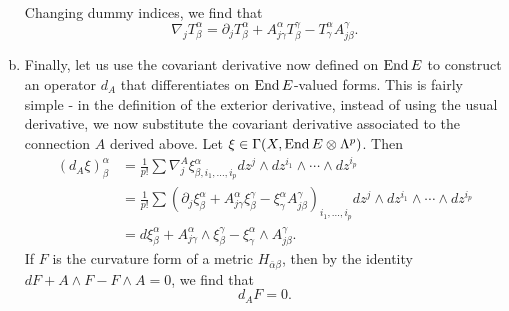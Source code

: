 \documentclass{../mathnotes}
\begin{document}
\begin{enumerate}[(a)]
\begin{align*}
        \end{align*}
        Changing dummy indices, we find that
        \[\nabla_jT^\alpha_\beta=\partial_jT^\alpha_\beta+A_{j\gamma}^\alpha T_\beta^\gamma -T^\alpha_\gamma A^\gamma_{j\beta}.\]
    \item Finally, let us use the covariant derivative now defined on $\operatorname{End} E$ to construct an operator $d_A$
        that differentiates on $\operatorname{End} E$-valued forms. This is fairly simple - in the definition of the exterior derivative, instead of using the usual
        derivative, we now substitute the covariant derivative associated to the connection $A$ derived above. Let $\xi\in\Gamma(X,\operatorname{End} E\otimes\Lambda^p)$. Then
        \begin{align*}
            (d_A\xi)^\alpha_\beta&=\frac{1}{p!}\sum\nabla_j^A\xi^\alpha_{\beta,i_1,\ldots,i_p}dz^j\wedge dz^{i_1}\wedge\cdots\wedge dz^{i_p}\\
            &=\frac{1}{p!}\sum\left(\partial_j\xi^\alpha_{\beta}+A_{j\gamma}^\alpha\xi^\gamma_\beta-\xi^\alpha_\gamma A_{j\beta}^\gamma \right)_{i_1,\ldots,i_p}dz^j\wedge dz^{i_1}\wedge\cdots\wedge dz^{i_p}\\
            &=d\xi^\alpha_\beta+A^\alpha_{j\gamma}\wedge\xi^\gamma_\beta-\xi^\alpha_\gamma\wedge A^\gamma_{j\beta}.
        \end{align*}
        If $F$ is the curvature form of a metric $H_{\bar\alpha\beta}$, then by the identity $dF+A\wedge F-F\wedge A=0$, we find that
        \[d_AF=0.\]
\end{enumerate}
\end{document}
